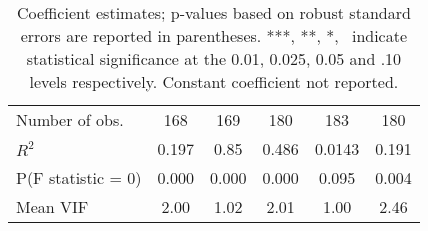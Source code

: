 \begin{table}[!htb]
\begin{tabular}{lccccc}
\midrule
Number of obs.                & 168         & 169        & 180        & 183             & 180   \\
$R^2$                         & 0.197       & 0.85       & 0.486      & 0.0143          & 0.191 \\
P(F statistic = 0)            & 0.000       & 0.000      & 0.000      & 0.095           & 0.004 \\
Mean VIF                      & 2.00        & 1.02       & 2.01       & 1.00            & 2.46 \\
\bottomrule
\end{tabular}
\caption*{\footnotesize Coefficient estimates; p-values based on robust standard errors are reported in parentheses.
***, **, *, \dag \ indicate statistical significance at the 0.01, 0.025, 0.05 and .10 levels respectively.
Constant coefficient not reported.}
\end{table}
